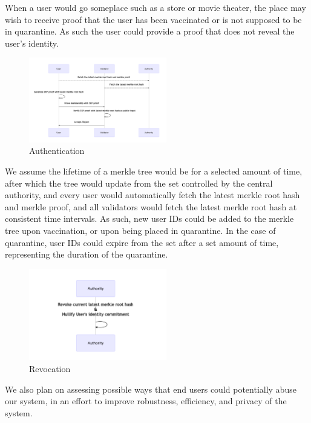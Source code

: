 \documentclass[sigconf, nonacm=true]{acmart}
\begin{document}
When a user would go someplace such as a store or movie theater, the place may wish to receive proof that the user has been vaccinated or is not supposed to be in quarantine. As such the user could provide a proof that does not reveal the user's identity.

\begin{figure}[H]
	\centering
	\includegraphics[width=6cm]{image/authentication.png}
	\caption{Authentication}
	\label{fig:auth}
\end{figure}

We assume the lifetime of a merkle tree would be for a selected amount of time, after which the tree would update from the set controlled by the central authority, and every user would automatically fetch the latest merkle root hash and merkle proof, and all validators would fetch the latest merkle root hash at consistent time intervals. As such, new user IDs could be added to the merkle tree upon vaccination, or upon being placed in quarantine. In the case of quarantine, user IDs could expire from the set after a set amount of time, representing the duration of the quarantine.

\begin{figure}[H]
	\centering
	\includegraphics[width=6cm]{image/revocation.png}
	\caption{Revocation}
	\label{fig:rev}
\end{figure}

We also plan on assessing possible ways that end users could potentially abuse our system, in an effort to improve robustness, efficiency, and privacy of the system.



\end{document}
